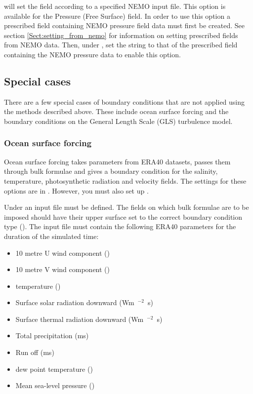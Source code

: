  will set the field according to a specified NEMO
input file. This option is available for the Pressure (Free Surface) field.
In order to use this option a prescribed field containing NEMO pressure
field data must first be created. See section \ref{Sect:setting_from_nemo}
for information on setting prescribed fields from NEMO data. Then, under
, set the string to that of the prescribed
field containing the NEMO pressure data to enable this option.


\subsection{Special cases}\label{Sect:BCs:special}

There are a few special cases of boundary conditions that are not applied
using the methods described above.  These include ocean surface forcing and
the boundary conditions on the General Length Scale (GLS) turbulence model.

\subsubsection{Ocean surface forcing}\label{Sect:BCs:special:oceans}

Ocean surface forcing takes parameters from ERA40 datasets, passes them
through bulk formulae and gives a boundary condition for the salinity,
temperature, photosynthetic radiation and velocity fields. The settings for
these options are in . However, you must also set up
.

Under  an input file must be defined. The fields on 
which bulk formulae are to be imposed should have their upper surface set to the correct
boundary condition type ().
The input file must contain the following ERA40 parameters for the
duration of the simulated time:
\begin{itemize}
 \item 10 metre U wind component (\ms)
 \item 10 metre V wind component (\ms)
 \item \m[2] temperature (\K)
 \item Surface solar radiation downward (\unit{Wm\ensuremath{^{-2}}s})
 \item Surface thermal radiation downward (\unit{Wm\ensuremath{^{-2}}s})
 \item Total precipitation (\unit{ms})
 \item Run off (\unit{ms})
 \item \m[2] dew point temperature (\K)
 \item Mean sea-level pressure (\Pa)
\end{itemize}

